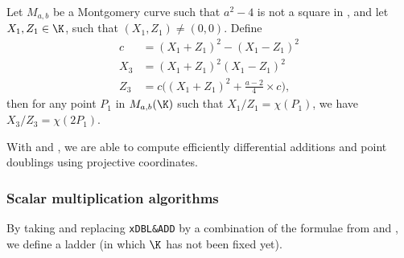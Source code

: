 \begin{lemma}
  \label{lemma:xDBL}
  Let $M_{a,b}$ be a Montgomery curve such that $a^2-4$ is not a square in \K, and
  let $X_1, Z_1 \in \K$, such that $(X_1,Z_1) \neq (0,0)$. Define
  \begin{align*}
    c   & = (X_1 + Z_1)^2 - (X_1 - Z_1)^2                   \\
    X_3 & = (X_1 + Z_1)^2(X_1-Z_1)^2                        \\
    Z_3 & = c\Big((X_1 + Z_1)^2+\frac{a-2}{4}\times c\Big),
  \end{align*}
  then for any point $P_1$ in $M_{a,b}(\K)$ such that $X_1/Z_1 = \chi(P_1)$,
  we have $X_3/Z_3 = \chi(2P_1)$.
\end{lemma}

With  and , we are able to compute efficiently
differential additions and point doublings using projective coordinates.

\subsubsection{Scalar multiplication algorithms}
\label{subsec:ECC-ladder}

By taking  and replacing \texttt{xDBL\&ADD} by a
combination of the formulae from  and ,
we define a ladder  (in which $\K$ has not been fixed yet).

%

